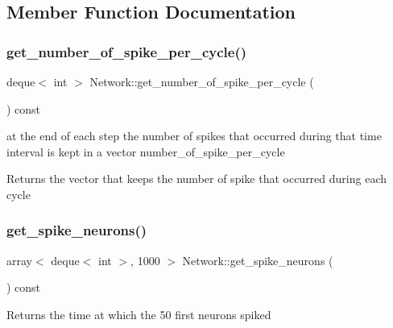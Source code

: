 \subsection{Member Function Documentation}
\mbox{\label{class_network_acc8227556c922215947eb3d88fcf2161}} 
\subsubsection{\texorpdfstring{get\+\_\+number\+\_\+of\+\_\+spike\+\_\+per\+\_\+cycle()}{get\_number\_of\_spike\_per\_cycle()}}
{\footnotesize\ttfamily deque$<$ int $>$ Network\+::get\+\_\+number\+\_\+of\+\_\+spike\+\_\+per\+\_\+cycle (\begin{DoxyParamCaption}{ }\end{DoxyParamCaption}) const}

at the end of each step the number of spikes that occurred during that time interval is kept in a vector number\+\_\+of\+\_\+spike\+\_\+per\+\_\+cycle \begin{DoxyReturn}{Returns}
the vector that keeps the number of spike that occurred during each cycle 
\end{DoxyReturn}
\mbox{\label{class_network_aa091395c56fe860d89c10b605e227727}} 
\subsubsection{\texorpdfstring{get\+\_\+spike\+\_\+neurons()}{get\_spike\_neurons()}}
{\footnotesize\ttfamily array$<$ deque$<$ int $>$, 1000 $>$ Network\+::get\+\_\+spike\+\_\+neurons (\begin{DoxyParamCaption}{ }\end{DoxyParamCaption}) const}

\begin{DoxyReturn}{Returns}
the time at which the 50 first neurons spiked 
\end{DoxyReturn}
\mbox{\label{class_network_ad9c58cb65b33316b93804ed59c3c35ab}} 
